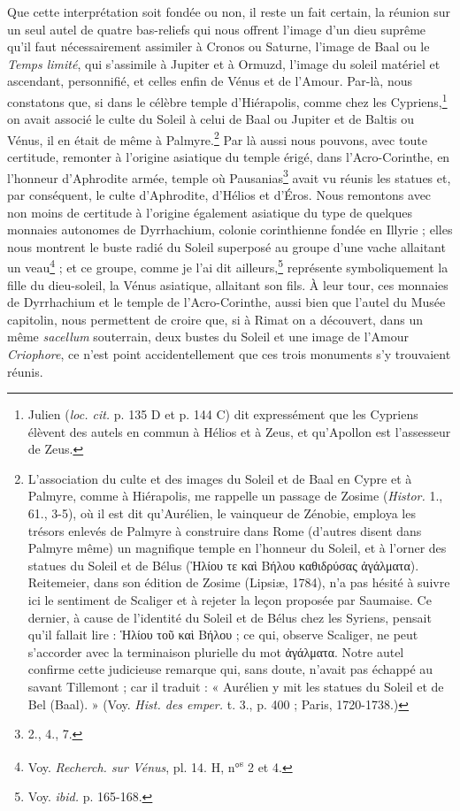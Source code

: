 \documentclass{article}
\begin{document}
Que cette interprétation soit fondée ou non, il reste un fait certain, la réunion sur un seul autel de quatre bas-reliefs qui nous offrent l'image d'un dieu suprême qu'il faut nécessairement assimiler à Cronos ou Saturne, l'image de Baal ou le \emph{Temps limité}, qui s'assimile à Jupiter et à Ormuzd, l'image du soleil matériel et ascendant, personnifié, et celles enfin de Vénus et de l'Amour. Par-là, nous constatons que, si dans le célèbre temple d'Hiérapolis, comme chez les Cypriens,\footnote{Julien (\emph{loc. cit.} p. 135 D et p. 144 C) dit expressément que les Cypriens élèvent des autels en commun à Hélios et à Zeus, et qu'Apollon est l'assesseur de Zeus.} on avait associé le culte du Soleil à celui de Baal ou Jupiter et de Baltis ou Vénus, il en était de même à Palmyre.\footnote{L'association du culte et des images du Soleil et de Baal en Cypre et à Palmyre, comme à Hiérapolis, me rappelle un passage de Zosime (\emph{Histor.} 1., 61., 3-5), où il est dit qu'Aurélien, le vainqueur de Zénobie, employa les trésors enlevés de Palmyre à construire dans Rome (d'autres disent dans Palmyre même) un magnifique temple en l'honneur du Soleil, et à l'orner des statues du Soleil et de Bélus (\textgreek{Ἡλίου τε καὶ Βήλου καθιδρύσας ἀγάλματα}). Reitemeier, dans son édition de Zosime (Lipsiæ, 1784), n'a pas hésité à suivre ici le sentiment de Scaliger et à rejeter la leçon proposée par Saumaise. Ce dernier, à cause de l'identité du Soleil et de Bélus chez les Syriens, pensait qu'il fallait lire : \textgreek{Ἡλίου τοῦ καὶ Βήλου} ; ce qui, observe Scaliger, ne peut s'accorder avec la terminaison plurielle du mot \textgreek{ἀγάλματα}. Notre autel confirme cette judicieuse remarque qui, sans doute, n'avait pas échappé au savant Tillemont ; car il traduit : « Aurélien y mit les statues du Soleil et de Bel (Baal). » (Voy. \emph{Hist. des emper.} t. 3., p. 400 ; Paris, 1720-1738.)} Par là aussi nous pouvons, avec toute certitude, remonter à l'origine asiatique du temple érigé, dans l'Acro-Corinthe, en l'honneur d'Aphrodite armée, temple où Pausanias\footnote{2., 4., 7.} avait vu réunis les statues et, par conséquent, le culte d'Aphrodite, d'Hélios et d'Éros. Nous remontons avec non moins de certitude à l'origine également asiatique du type de quelques monnaies autonomes de Dyrrhachium, colonie corinthienne fondée en Illyrie ; elles nous montrent le buste radié du Soleil superposé au groupe d'une vache allaitant un veau\footnote{Voy. \emph{Recherch. sur Vénus}, pl. 14. H, n°\textsuperscript{s} 2 et 4.} ; et ce groupe, comme je l'ai dit ailleurs,\footnote{Voy. \emph{ibid.} p. 165-168.} représente symboliquement la fille du dieu-soleil, la Vénus asiatique, allaitant son fils. À leur tour, ces monnaies de Dyrrhachium et le temple de l'Acro-Corinthe, aussi bien que l'autel du Musée capitolin, nous permettent de croire que, si à Rimat on a découvert, dans un même \emph{sacellum} souterrain, deux bustes du Soleil et une image de l'Amour \emph{Criophore}, ce n'est point accidentellement que ces trois monuments s'y trouvaient réunis.
\end{document}
